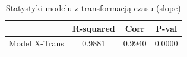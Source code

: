 \begin{table}[H]
\caption{Statystyki modelu z transformacją czasu (slope)}
\label{tab:zad4_trans}
\begin{tabular}{lccc}
\toprule
 & R-squared & Corr & P-val \\
\midrule
Model X-Trans & 0.9881 & 0.9940 & 0.0000 \\
\bottomrule
\end{tabular}
\end{table}
